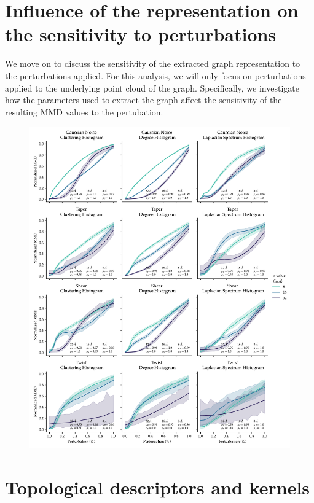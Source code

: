 
\section{Influence of the representation on the sensitivity to perturbations}

We move on to discuss the sensitivity of the extracted graph representation to
the perturbations applied. For this analysis, we will only focus on
perturbations applied to the underlying point cloud of the graph. Specifically,
we investigate how the parameters used to extract the graph affect the
sensitivity of the resulting MMD values to the pertubation.

\begin{figure}
  \includegraphics[width=\textwidth]{./figures/results/res_2.pdf}
\end{figure}

\section{Topological descriptors and kernels}

